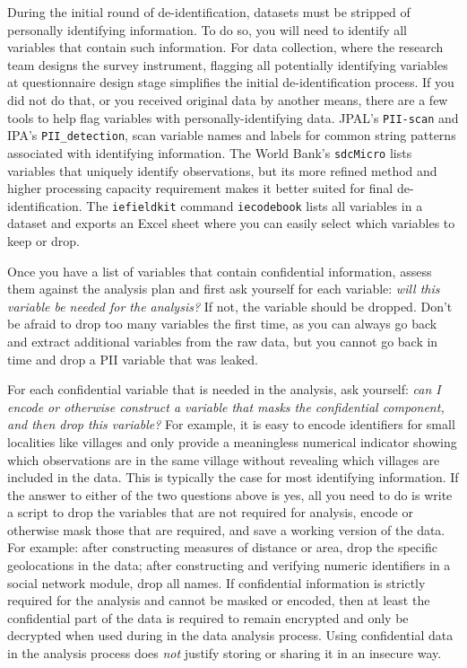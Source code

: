 During the initial round of de-identification,
datasets must be stripped of personally identifying information.
To do so, you will need to identify all variables that contain such information.
For data collection, where the research team designs the survey instrument,
flagging all potentially identifying variables at questionnaire design stage
simplifies the initial de-identification process.
If you did not do that, or you received original data by another means,
there are a few tools to help flag variables with personally-identifying data.
JPAL's \texttt{PII-scan} and
IPA's \texttt{PII\_detection},
scan variable names and labels for common string patterns
associated with identifying information.
The World Bank's \texttt{sdcMicro}
lists variables that uniquely identify observations,
but its more refined method and
higher processing capacity requirement makes it
better suited for final de-identification.
The \texttt{iefieldkit} command \texttt{iecodebook}
lists all variables in a dataset and exports an Excel sheet
where you can easily select which variables to keep or drop.

Once you have a list of variables that contain confidential information,
assess them against the analysis plan and first ask yourself for each variable:
\textit{will this variable be needed for the analysis?}
If not, the variable should be dropped.
Don't be afraid to drop too many variables the first time,
as you can always go back and extract additional variables from the raw data,
but you cannot go back in time and drop a PII variable that was leaked.

For each confidential variable that is needed in the analysis, ask yourself:
\textit{can I encode or otherwise construct a variable that masks the confidential component, and
	then drop this variable?}
For example, it is easy to encode identifiers for small localities like villages
and only provide a meaningless numerical indicator
showing which observations are in the same village
without revealing which villages are included in the data.
This is typically the case for most identifying information.
If the answer to either of the two questions above is yes,
all you need to do is write a script to drop the variables that are not required for analysis,
encode or otherwise mask those that are required,
and save a working version of the data.
For example:
after constructing measures of distance or area,
drop the specific geolocations in the data;
after constructing and verifying numeric identifiers in
a social network module, drop all names.
If confidential information is strictly required for the analysis and cannot be
masked or encoded,
then at least the confidential part of the data is required 
to remain encrypted 
and only be decrypted when used during in the data analysis process.
Using confidential data in the analysis process
does \textit{not} justify storing or sharing it in an insecure way.

